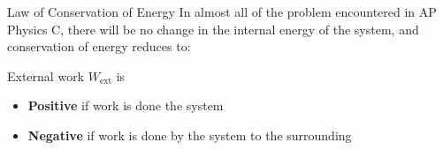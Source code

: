 \documentclass[12pt,compress,aspectratio=169]{beamer}
\begin{document}
\begin{frame}{Law of Conservation of Energy}
  In almost all of the problem encountered in AP Physics C, there will be no
  change in the internal energy of the system, and conservation of energy
  reduces to:
  

  External work $W_\text{ext}$ is
  \begin{itemize}
  \item\textbf{Positive} if work is done  the system
  \item\textbf{Negative} if work is done  by the system to the
    surrounding
  \end{itemize}
\end{frame}



\end{document}
